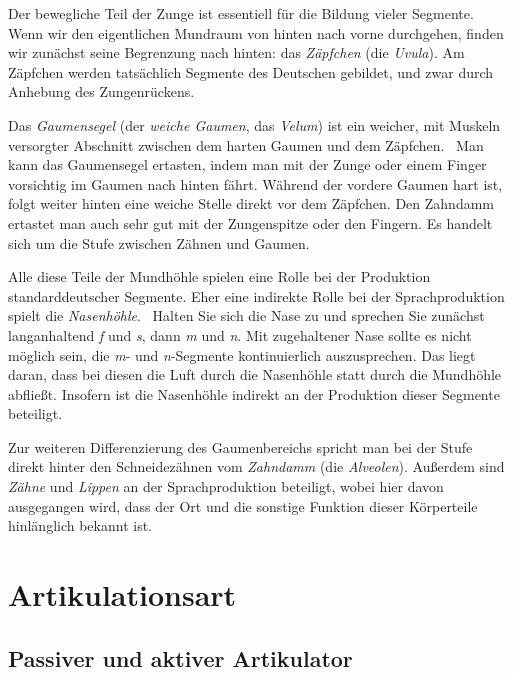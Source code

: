 Der bewegliche Teil der Zunge ist essentiell für die Bildung vieler Segmente.
Wenn wir den eigentlichen Mundraum von hinten nach vorne durchgehen, finden wir zunächst seine Begrenzung nach hinten: das \textit{Zäpfchen} (die \textit{Uvula}).
Am Zäpfchen werden tatsächlich Segmente des Deutschen gebildet, und zwar durch Anhebung des Zungenrückens.

Das \textit{Gaumensegel} (der \textit{weiche Gaumen}, das \textit{Velum}) ist ein weicher, mit Muskeln versorgter Abschnitt zwischen dem harten Gaumen und dem Zäpfchen.
\TuBegin~Man kann das Gaumensegel ertasten, indem man mit der Zunge oder einem Finger vorsichtig im Gaumen nach hinten fährt.
Während der vordere Gaumen hart ist, folgt weiter hinten eine weiche Stelle direkt vor dem Zäpfchen.
Den Zahndamm ertastet man auch sehr gut mit der Zungenspitze oder den Fingern.
Es handelt sich um die Stufe zwischen Zähnen und Gaumen.

Alle diese Teile der Mundhöhle spielen eine Rolle bei der Produktion standarddeutscher Segmente.
Eher eine indirekte Rolle bei der Sprachproduktion spielt die \textit{Nasenhöhle}.
\TuBegin~Halten Sie sich die Nase zu und sprechen Sie zunächst langanhaltend \textit{f} und \textit{s}, dann \textit{m} und \textit{n}.
Mit zugehaltener Nase sollte es nicht möglich sein, die \textit{m}- und \textit{n}-Segmente kontinuierlich auszusprechen.
Das liegt daran, dass bei diesen die Luft durch die Nasenhöhle statt durch die Mundhöhle abfließt.
Insofern ist die Nasenhöhle indirekt an der Produktion dieser Segmente beteiligt.

Zur weiteren Differenzierung des Gaumenbereichs spricht man bei der Stufe direkt hinter den Schneidezähnen vom \textit{Zahndamm} (die \textit{Alveolen}).
Außerdem sind \textit{Zähne} und \textit{Lippen} an der Sprachproduktion beteiligt, wobei hier davon ausgegangen wird, dass der Ort und die sonstige Funktion dieser Körperteile hinlänglich bekannt ist.

\section{Artikulationsart}

\label{sec:artikulationsart}

\subsection{Passiver und aktiver Artikulator}

\label{sec:artikulator}

